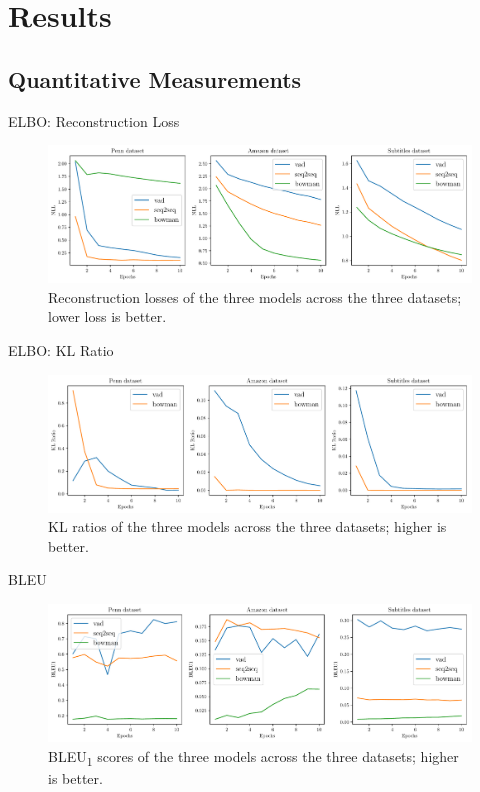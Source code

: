 \documentclass[aspectratio=169, 11pt]{beamer}
\begin{document}
\section{Results}

\subsection{Quantitative Measurements}
\begin{frame}{ELBO: Reconstruction Loss}
  \begin{figure}[!ht]
    \centering
    \includegraphics[width=130mm]{results/nll.pdf}
    \caption{Reconstruction losses of the three models across the three datasets; lower loss is better. \label{r:nll}}
    \end{figure}
\end{frame}

\begin{frame}{ELBO: KL Ratio}
  \begin{figure}[!ht]
    \centering
    \includegraphics[width=130mm]{results/kl_ratio.pdf}
    \caption{KL ratios of the three models across the three datasets; higher is better.\label{r:kl_ratio}}
    \end{figure}
\end{frame}

\begin{frame}{BLEU}
  \begin{figure}[!ht]
    \centering
    \includegraphics[width=130mm]{results/bleu1.pdf}
    \caption{BLEU\textsubscript{1} scores of the three models across the three datasets; higher is better.\label{r:bleu}}
    \end{figure}  
\end{frame}
\end{document}
